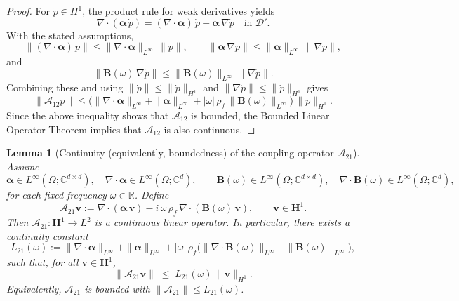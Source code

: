 \documentclass[pdflatex,sn-mathphys-num]{sn-jnl}
\theoremstyle{thmstyleone}%
\theoremstyle{thmstyletwo}%
\theoremstyle{thmstylethree}%
\newtheorem{lemma}[theorem]{Lemma}
\theoremstyle{definition}
\begin{document}
	\begin{proof}
		For $\dot p\in H^1$, the product rule for weak derivatives yields
		\[
		\nabla\!\cdot(\boldsymbol{\alpha}\,\dot p)
		= (\nabla\!\cdot\boldsymbol{\alpha})\,\dot p + \boldsymbol{\alpha}\,\nabla \dot p
		\quad\text{in } \bm{\mathscr{D}}'.
		\]
		With the stated assumptions,
		\[
		\|(\nabla\!\cdot\boldsymbol{\alpha})\,\dot p\|
		\le \|\nabla\!\cdot\boldsymbol{\alpha}\|_{L^\infty}\,\|\dot p\|,
		\qquad
		\|\boldsymbol{\alpha}\,\nabla \dot p\|
		\le \|\boldsymbol{\alpha}\|_{L^\infty}\,\|\nabla \dot p\|,
		\]
		and
		\[
		\|\mathbf{B}(\omega)\,\nabla \dot p\|
		\le \|\mathbf{B}(\omega)\|_{L^\infty}\,\|\nabla \dot p\|.
		\]
		Combining these and using $\|\dot p\|\le \|\dot p\|_{H^1}$ and
		$\|\nabla \dot p\|\le \|\dot p\|_{H^1}$ gives
		\[
		\|\mathcal{A}_{12}\dot p\|
		\le \Big(\|\nabla\!\cdot\boldsymbol{\alpha}\|_{L^\infty}
		+ \|\boldsymbol{\alpha}\|_{L^\infty}
		+ |\omega|\,\rho_f\,\|\mathbf{B}(\omega)\|_{L^\infty}\Big)\,\|\dot p\|_{H^1}.
		\]
		Since the above inequality shows that $\mathcal{A}_{12}$ is bounded, the Bounded Linear Operator Theorem implies that $\mathcal{A}_{12}$ is also continuous.
	\end{proof}
	
	
	
	
	\begin{lemma}[Continuity (equivalently, boundedness) of the coupling operator $\mathcal{A}_{21}$]\label{lem:A21-continuity}
		Assume
		\[
		\boldsymbol{\alpha}\in L^\infty(\Omega;\mathbb{C}^{d\times d}),
		\quad
		\nabla\!\cdot\boldsymbol{\alpha}\in L^\infty(\Omega;\mathbb{C}^d),
		\qquad
		\mathbf{B}(\omega)\in L^\infty(\Omega;\mathbb{C}^{d\times d}),
		\quad
		\nabla\!\cdot\mathbf{B}(\omega)\in L^\infty(\Omega;\mathbb{C}^d),
		\]
		for each fixed frequency $\omega\in\mathbb{R}$. Define
		\[
		\mathcal{A}_{21}\mathbf{v}
		:= \nabla\!\cdot(\boldsymbol{\alpha}\,\mathbf{v}) - i\,\omega\,\rho_f\,\nabla\!\cdot(\mathbf{B}(\omega)\,\mathbf{v}),
		\qquad \mathbf{v}\in \bm{H}^{1}.
		\]
		Then $\mathcal{A}_{21}:\bm{H}^{1}\to L^2$ is a continuous linear operator. In particular, there exists a continuity constant
		\[
		L_{21}(\omega)
		:= \|\nabla\!\cdot\boldsymbol{\alpha}\|_{L^\infty}
		+ \|\boldsymbol{\alpha}\|_{L^\infty}
		+ |\omega|\,\rho_f\big(\|\nabla\!\cdot\mathbf{B}(\omega)\|_{L^\infty}
		+ \|\mathbf{B}(\omega)\|_{L^\infty}\big),
		\]
		such that, for all $\mathbf{v}\in\bm{H}^{1}$,
		\[
		\|\mathcal{A}_{21}\mathbf{v}\|
		\;\le\;
		L_{21}(\omega)\,\|\mathbf{v}\|_{H^1}.
		\]
		Equivalently, $\mathcal{A}_{21}$ is bounded with $\|\mathcal{A}_{21}\|\le L_{21}(\omega)$.
	\end{lemma}
	
\end{document}
